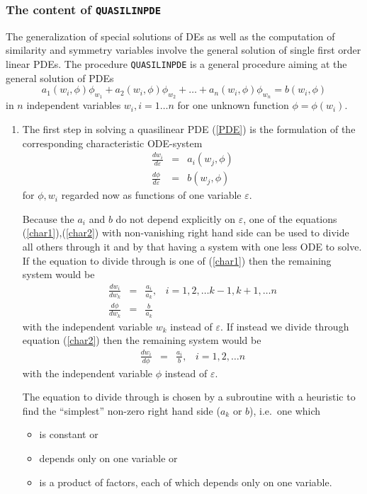 \subsubsection{The content of \texttt{QUASILINPDE}}
The generalization of special solutions of DEs as well as the computation of
similarity and symmetry variables involve the general solution of single
first order linear PDEs.
The procedure \texttt{QUASILINPDE} is a general procedure
aiming at the general solution of
PDEs
\begin{equation}
   a_1(w_i,\phi)\phi_{w_1} + a_2(w_i,\phi)\phi_{w_2} + \ldots +
   a_n(w_i,\phi)\phi_{w_n} = b(w_i,\phi) \label{PDE}
\end{equation}
in $n$ independent variables $w_i, i=1\ldots n$ for one unknown function
$\phi=\phi(w_i)$.
\begin{enumerate}
\item
The first step in solving a quasilinear PDE (\ref{PDE})
is the formulation of the corresponding characteristic ODE-system
\begin{eqnarray}
\frac{dw_i}{d\varepsilon} & = & a_i(w_j,\phi) \label{char1}   \\
\frac{d\phi}{d\varepsilon} & = & b(w_j,\phi)  \label{char2}
\end{eqnarray}
for $\phi, w_i$ regarded now as functions of one variable $\varepsilon$.

Because the $a_i$ and $b$ do not depend explicitly on $\varepsilon$, one of the
equations (\ref{char1}),(\ref{char2}) with non-vanishing right hand side
can be used to divide all others through it and by that having a system
with one less ODE to solve. 
If the equation to divide through is one of
(\ref{char1}) then the remaining system would be
\begin{eqnarray}
\frac{dw_i}{dw_k} & = & \frac{a_i}{a_k} , \;\;\;i=1,2,\ldots k-1,k+1,\ldots n
  \label{char3} \\
\frac{d\phi}{dw_k} & = & \frac{b}{a_k}  \label{char4}
\end{eqnarray}
with the independent variable $w_k$ instead of $\varepsilon$.
If instead we divide through equation
(\ref{char2}) then the remaining system would be
\begin{eqnarray}
\frac{dw_i}{d\phi} & = & \frac{a_i}{b} , \;\;\;i=1,2,\ldots n
  \label{char3a}
\end{eqnarray}
with the independent variable $\phi$ instead of $\varepsilon$.

The equation to divide through is chosen by a
subroutine with a heuristic to find the ``simplest'' non-zero
right hand side ($a_k$ or $b$), i.e.\ one which
\begin{itemize}
\item is constant or
\item depends only on one variable or
\item is a product of factors, each of which depends only on
one variable.
\end{itemize}


\end{enumerate}
